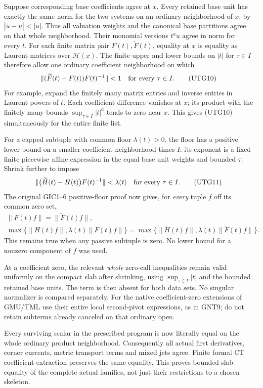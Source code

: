 Suppose corresponding base coefficients agree at $x$.
Every retained base unit has exactly the same norm for the
two systems on an ordinary neighborhood of $x$, by
$|\widetilde u-u|<|u|$.  Thus all valuation weights and the
canonical base partitions agree on that whole neighborhood.
Their monomial versions $t^a u$ agree in norm for every $t$.
For each finite matrix pair $F(t),\widetilde F(t)$, equality
at $x$ is equality as Laurent matrices over $\mathscr H(x)$.
The finite upper and lower bounds on $|t|$ for $\tau\in I$
therefore allow one ordinary coefficient neighborhood on which
\[
 \|(\widetilde F(t)-F(t))F(t)^{-1}\|<1
                         \quad\hbox{for every }\tau\in I.
 \tag{UTG10}
\]
For example, expand the finitely many matrix entries and
inverse entries in Laurent powers of $t$.  Each coefficient
difference vanishes at $x$; its product with the finitely
many bounds $\sup_{\tau\in I}|t|^a$ tends to zero near $x$.
This gives (UTG10) simultaneously for the entire finite list.

For a capped subtuple with common floor $\lambda(t)>0$,
the floor has a positive lower bound on a smaller coefficient
neighborhood times $I$: its exponent is a fixed finite
piecewise affine expression in the equal base unit weights
and bounded $\tau$.  Shrink further to impose
\[
 \|\bigl(\widetilde H(t)-H(t)\bigr)F(t)^{-1}\|
                                    <\lambda(t)
                         \quad\hbox{for every }\tau\in I.
 \tag{UTG11}
\]
The original GIC1--6 positive-floor proof now gives, for
\emph{every} tuple $f$ off its common zero set,
\[
 \begin{gathered}
 \|F(t)f\|=\|\widetilde F(t)f\|,\\
 \max\{\|H(t)f\|,\lambda(t)\|F(t)f\|\}
 =\max\{\|\widetilde H(t)f\|,
                       \lambda(t)\|\widetilde F(t)f\|\}.
 \end{gathered}
 \tag{UTG12}
\]
This remains true when any passive subtuple is zero.  No
lower bound for a nonzero component of $f$ was used.

At a coefficient zero, the relevant \emph{whole} zero-call
inequalities remain valid uniformly on the compact slab after
shrinking, using $\sup_{\tau\in I}|t|$ and the bounded retained
base units.  The term is then absent for both data sets.
No singular normalizer is compared separately.  For the
native coefficient-zero extensions of GMU/TML use their
entire local second-pivot expressions, as in GNT9; do not
retain subterms already canceled on that ordinary open.

Every surviving scalar in the prescribed program is now
literally equal on the whole ordinary product neighborhood.
Consequently all actual first derivatives, corner currents,
metric transport terms and mixed jets agree.  Finite formal
CT coefficient extraction preserves the same equality.
This proves bounded-slab equality of the complete actual
families, not just their restrictions to a chosen skeleton.

